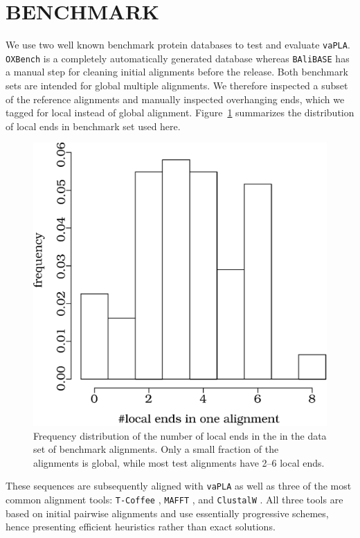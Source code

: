 \documentclass[a4paper,10pt]{article}
\let\cite\citep
\newcommand{\TODO}[1]{\begingroup\color{red}#1\endgroup}
\newcommand{\SAFTWARE}{\texttt{vaPLA}} %
\begin{document}
\section{\uppercase{Benchmark}}

We use two well known benchmark protein databases to test and evaluate
\SAFTWARE. \texttt{OXBench} \cite{oxbench} is a completely automatically
generated database whereas \texttt{BAliBASE} \cite{balibase} has a manual
step for cleaning initial alignments before the release.  Both benchmark
sets are intended for global multiple alignments. We therefore inspected a
subset of the reference alignments and manually inspected overhanging ends,
which we tagged for local instead of global alignment. Figure~\ref{fig:locs}
summarizes the distribution of local ends in benchmark set used here.

\begin{figure}
  \begin{center}
    \includegraphics[width=0.9\columnwidth]{localitiesDistribution.eps}
  \end{center}
  \caption{Frequency distribution of the number of local ends in the
      in the data set of benchmark alignments. Only a small fraction of the
      alignments is global, while most test alignments have 2--6 local
      ends. }
  \label{fig:locs}
\end{figure}

These sequences are subsequently aligned with \SAFTWARE{} as well as three
of the most common alignment tools: \texttt{T-Coffee}
\cite{Notredame:00,Chang:14}, \texttt{MAFFT} \cite{Katoh:05,Nakamura:18},
and \texttt{ClustalW} \cite{Larkin:07,Sievers:18}. All three tools are
based on initial pairwise alignments and use essentially progressive
schemes, hence presenting efficient heuristics rather than exact solutions.
\end{document}
